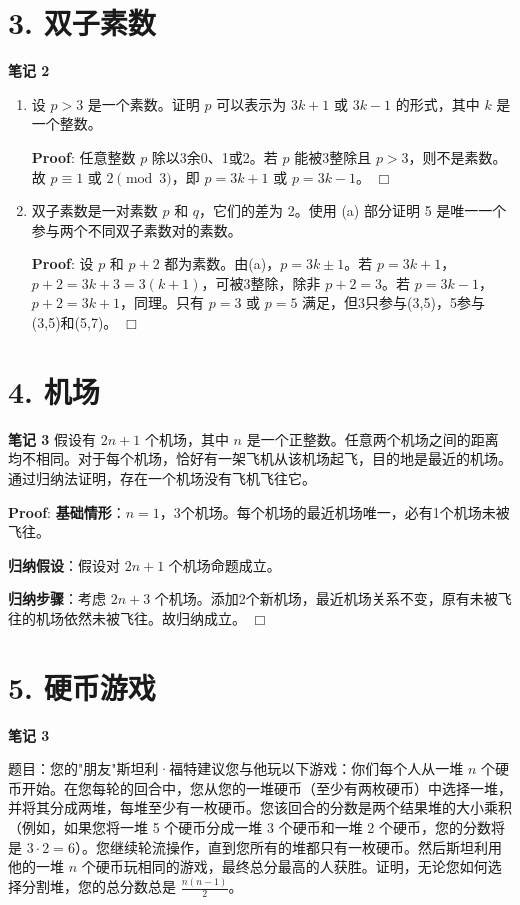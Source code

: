 \documentclass[11pt]{article}
\newenvironment{qparts}{\begin{enumerate}[{(}a{)}]}{\end{enumerate}}
\def\endproofmark{$\Box$}
\newenvironment{proof}{\par{\bf Proof}:}{\endproofmark\smallskip}
\begin{document}
\section*{3. 双子素数}
\textbf{笔记 2}
\begin{qparts}
\item 设 $p > 3$ 是一个素数。证明 $p$ 可以表示为 $3k + 1$ 或 $3k - 1$ 的形式，其中 $k$ 是一个整数。

\begin{proof}
任意整数 $p$ 除以3余0、1或2。若 $p$ 能被3整除且 $p>3$，则不是素数。故 $p\equiv1$ 或 $2\pmod{3}$，即 $p=3k+1$ 或 $p=3k-1$。
\end{proof}

\item 双子素数是一对素数 $p$ 和 $q$，它们的差为 2。使用 (a) 部分证明 5 是唯一一个参与两个不同双子素数对的素数。

\begin{proof}
设 $p$ 和 $p+2$ 都为素数。由(a)，$p=3k\pm1$。若 $p=3k+1$，$p+2=3k+3=3(k+1)$，可被3整除，除非 $p+2=3$。若 $p=3k-1$，$p+2=3k+1$，同理。只有 $p=3$ 或 $p=5$ 满足，但3只参与(3,5)，5参与(3,5)和(5,7)。
\end{proof}
\end{qparts}

\section*{4. 机场}
\textbf{笔记 3} 假设有 $2n + 1$ 个机场，其中 $n$ 是一个正整数。任意两个机场之间的距离均不相同。对于每个机场，恰好有一架飞机从该机场起飞，目的地是最近的机场。通过归纳法证明，存在一个机场没有飞机飞往它。

\begin{proof}
\textbf{基础情形}：$n=1$，3个机场。每个机场的最近机场唯一，必有1个机场未被飞往。

\textbf{归纳假设}：假设对 $2n+1$ 个机场命题成立。

\textbf{归纳步骤}：考虑 $2n+3$ 个机场。添加2个新机场，最近机场关系不变，原有未被飞往的机场依然未被飞往。故归纳成立。
\end{proof}

\section*{5. 硬币游戏}
\textbf{笔记 3}

题目：您的"朋友"斯坦利·福特建议您与他玩以下游戏：你们每个人从一堆 $n$ 个硬币开始。在您每轮的回合中，您从您的一堆硬币（至少有两枚硬币）中选择一堆，并将其分成两堆，每堆至少有一枚硬币。您该回合的分数是两个结果堆的大小乘积（例如，如果您将一堆 5 个硬币分成一堆 3 个硬币和一堆 2 个硬币，您的分数将是 $3 \cdot 2 = 6$）。您继续轮流操作，直到您所有的堆都只有一枚硬币。然后斯坦利用他的一堆 $n$ 个硬币玩相同的游戏，最终总分最高的人获胜。证明，无论您如何选择分割堆，您的总分数总是 $\frac{n(n-1)}{2}$。
\end{document}
